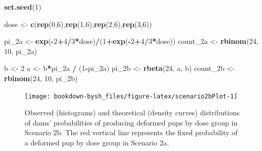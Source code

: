 \documentclass[
]{krantz}
\newenvironment{Shaded}{\begin{snugshade}}{\end{snugshade}}
\newcommand{\DecValTok}[1]{\textcolor[rgb]{0.06,0.06,0.06}{#1}}
\newcommand{\KeywordTok}[1]{\textcolor[rgb]{0.27,0.27,0.27}{\textbf{#1}}}
\newcommand{\NormalTok}[1]{#1}
\newcommand{\OperatorTok}[1]{\textcolor[rgb]{0.43,0.43,0.43}{\textbf{#1}}}
\newcommand{\StringTok}[1]{\textcolor[rgb]{0.5,0.5,0.5}{#1}}
\begin{document}
\begin{Shaded}
\begin{Highlighting}[]
\KeywordTok{set.seed}\NormalTok{(}\DecValTok{1}\NormalTok{)}

\NormalTok{dose <-}\StringTok{ }\KeywordTok{c}\NormalTok{(}\KeywordTok{rep}\NormalTok{(}\DecValTok{0}\NormalTok{,}\DecValTok{6}\NormalTok{),}\KeywordTok{rep}\NormalTok{(}\DecValTok{1}\NormalTok{,}\DecValTok{6}\NormalTok{),}\KeywordTok{rep}\NormalTok{(}\DecValTok{2}\NormalTok{,}\DecValTok{6}\NormalTok{),}\KeywordTok{rep}\NormalTok{(}\DecValTok{3}\NormalTok{,}\DecValTok{6}\NormalTok{))}

\NormalTok{pi_2a <-}\StringTok{ }\KeywordTok{exp}\NormalTok{(}\OperatorTok{-}\DecValTok{2}\OperatorTok{+}\DecValTok{4}\OperatorTok{/}\DecValTok{3}\OperatorTok{*}\NormalTok{dose)}\OperatorTok{/}\NormalTok{(}\DecValTok{1}\OperatorTok{+}\KeywordTok{exp}\NormalTok{(}\OperatorTok{-}\DecValTok{2}\OperatorTok{+}\DecValTok{4}\OperatorTok{/}\DecValTok{3}\OperatorTok{*}\NormalTok{dose))}
\NormalTok{count_2a <-}\StringTok{ }\KeywordTok{rbinom}\NormalTok{(}\DecValTok{24}\NormalTok{, }\DecValTok{10}\NormalTok{, pi_2a)}

\NormalTok{b <-}\StringTok{ }\DecValTok{2}
\NormalTok{a <-}\StringTok{ }\NormalTok{b}\OperatorTok{*}\NormalTok{pi_2a }\OperatorTok{/}\StringTok{ }\NormalTok{(}\DecValTok{1}\OperatorTok{-}\NormalTok{pi_2a)}
\NormalTok{pi_2b <-}\StringTok{ }\KeywordTok{rbeta}\NormalTok{(}\DecValTok{24}\NormalTok{, a, b)}
\NormalTok{count_2b <-}\StringTok{ }\KeywordTok{rbinom}\NormalTok{(}\DecValTok{24}\NormalTok{, }\DecValTok{10}\NormalTok{, pi_2b)  }
\end{Highlighting}
\end{Shaded}

\begin{figure}

{\centering \texttt{[image: bookdown-bysh\_files/figure-latex/scenario2bPlot-1]} 

}

\caption{Observed (histograms) and theoretical (density curves) distributions of dams' probabilities of producing deformed pups by dose group in Scenario 2b.  The red vertical line represents the fixed probability of a deformed pup by dose group in Scenario 2a.}\label{fig:scenario2bPlot}
\end{figure}
\end{document}
